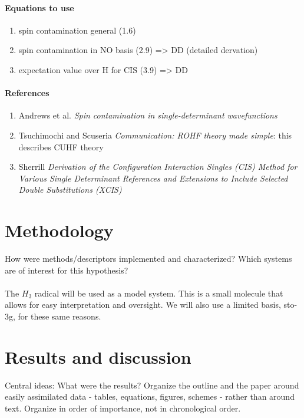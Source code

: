 \documentclass[twoside,twocolumn,9pt]{article}
\begin{document}
\paragraph*{Equations to use}
\begin{enumerate}
  \item spin contamination general (1.6)
  \item spin contamination in NO basis (2.9) => DD (detailed dervation)
  \item expectation value over H for CIS (3.9) => DD
\end{enumerate}
\paragraph*{References}
\begin{enumerate}
  \item Andrews et al. \textit{Spin contamination in single-determinant wavefunctions}
  \item Tsuchimochi and Scuseria \textit{Communication: ROHF theory made simple}: this describes CUHF theory
  \item Sherrill \textit{Derivation of the Configuration Interaction Singles (CIS) Method for Various Single Determinant References and Extensions to Include Selected Double Substitutions (XCIS)}
\end{enumerate}

\section{Methodology}

How were methods/descriptors implemented and characterized? Which systems are of interest for this hypothesis?
\paragraph*{}
The $H_3$ radical will be used as a model system. This is a small molecule that allows for easy interpretation and oversight. We will also use a limited basis, sto-3g, for these same reasons.
\section{Results and discussion}

Central ideas: What were the results? Organize the outline and the paper around easily assimilated data - tables, equations, figures, schemes - rather than around text. Organize in order of importance, not in chronological order.
\end{document}
